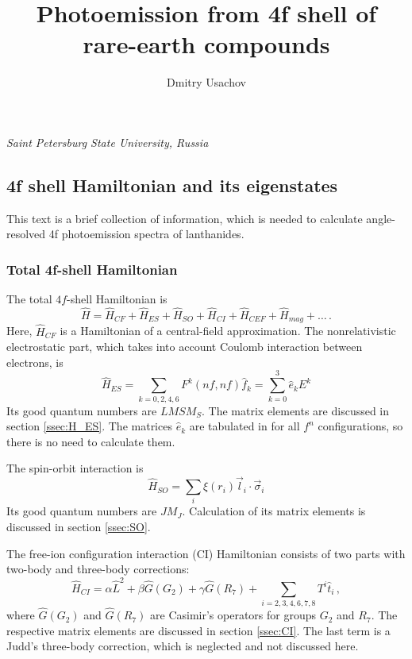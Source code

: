 \documentclass[a4paper,oneside,12pt]{extarticle}
\title{Photoemission from 4f shell of rare-earth compounds}
\author{Dmitry Usachov}
\begin{document}
\maketitle
\begin{center} 
\it Saint Petersburg State University, Russia
\end{center}

\tableofcontents
\newpage
%
\subsection {4f shell Hamiltonian and its eigenstates}

This text is a brief collection of information, which is needed to calculate angle-resolved 4f photoemission spectra of lanthanides.

\subsubsection {Total 4f-shell Hamiltonian}
%
The total $4f$-shell Hamiltonian is
%
\begin{equation}
\hat{H} = \hat{H}_{CF} + \hat{H}_{ES} + \hat{H}_{SO} + \hat{H}_{CI} + \hat{H}_{CEF} + \hat{H}_{mag} +\ldots \,.
\end{equation}
%
Here, $\hat{H}_{CF}$ is a Hamiltonian of a central-field approximation.
The nonrelativistic electrostatic part, which takes into account Coulomb interaction between electrons, is
$$
\hat{H}_{ES} = \sum_{k=0,2,4,6} F^k(nf,nf) \hat{f}_k = \sum_{k=0}^3 \hat{e}_k E^k
$$
%
Its good quantum numbers are $LMSM_S$. The matrix elements are discussed in section \ref{ssec:H_ES}. The matrices $\hat{e}_k$ are tabulated in \cite{NielsonKoster} for all $f^n$ configurations, so there is no need to calculate them.

The spin-orbit interaction is 
$$
\hat{H}_{SO} = \sum_i \xi(r_i) \vec{l}_i \cdot \vec{\sigma}_i
$$
%
Its good quantum numbers are $JM_J$. Calculation of its matrix elements is discussed in section \ref{ssec:SO}.

The free-ion configuration interaction (CI) Hamiltonian consists of two parts with two-body and three-body corrections:
$$
\hat{H}_{CI} = \alpha \hat{L}^2 + \beta \hat{G} (G_2) + \gamma \hat{G} (R_7)
+ \sum_{i=2,3,4,6,7,8} T^i \hat{t}_i \,,
$$
where $\hat{G}(G_2)$ and $\hat{G}(R_7)$ are Casimir's operators for groups $G_2$ and $R_7$. The respective matrix elements are discussed in section \ref{ssec:CI}. The last term is a Judd's three-body correction, which is neglected and not discussed here.
\end{document}
